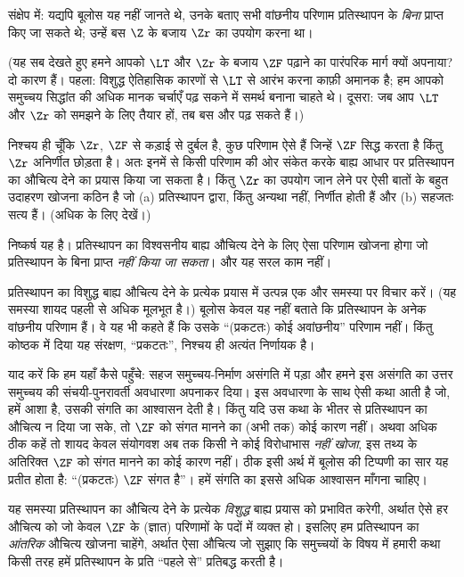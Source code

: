 \documentclass[../../../include/open-logic-section]{subfiles}
\begin{document}
संक्षेप में: यद्यपि बूलोस यह नहीं जानते थे, उनके बताए सभी वांछनीय परिणाम
प्रतिस्थापन के \emph{बिना} प्राप्त किए जा सकते थे; उन्हें बस $\Z$ के बजाय
$\Zr$ का उपयोग करना था।

(यह सब देखते हुए हमने आपको $\LT$ और $\Zr$ के बजाय $\ZF$ पढ़ाने का पारंपरिक
मार्ग क्यों अपनाया? दो कारण हैं। पहला: विशुद्ध ऐतिहासिक कारणों से $\LT$ से
आरंभ करना काफ़ी अमानक है; हम आपको समुच्चय सिद्धांत की अधिक मानक चर्चाएँ पढ़
सकने में समर्थ बनाना चाहते थे। दूसरा: जब आप $\LT$ और $\Zr$ को समझने के लिए
तैयार हों, तब बस \citealt{Potter2004} और \citealt{ButtonLT1} पढ़ सकते हैं।)

निश्चय ही चूँकि $\Zr$, $\ZF$ से कड़ाई से दुर्बल है, कुछ परिणाम ऐसे हैं
जिन्हें $\ZF$ सिद्ध करता है किंतु $\Zr$ अनिर्णीत छोड़ता है। अतः इनमें से
किसी परिणाम की ओर संकेत करके बाह्य आधार पर प्रतिस्थापन का औचित्य देने का
प्रयास किया जा सकता है। किंतु $\Zr$ का उपयोग जान लेने पर ऐसी बातों के बहुत
उदाहरण खोजना कठिन है जो (a) प्रतिस्थापन द्वारा, किंतु अन्यथा नहीं, निर्णीत
होती हैं और (b) सहजतः सत्य हैं। (अधिक के लिए
\citealt[\S13.2]{Potter2004} देखें।)

निष्कर्ष यह है। प्रतिस्थापन का विश्वसनीय बाह्य औचित्य देने के लिए ऐसा परिणाम
खोजना होगा जो प्रतिस्थापन के बिना प्राप्त \emph{नहीं किया जा सकता}। और यह
सरल काम नहीं।

प्रतिस्थापन का विशुद्ध बाह्य औचित्य देने के प्रत्येक प्रयास में उत्पन्न एक
और समस्या पर विचार करें। (यह समस्या शायद पहली से अधिक मूलभूत है।) बूलोस
केवल यह नहीं बताते कि प्रतिस्थापन के अनेक वांछनीय परिणाम हैं। वे यह भी कहते
हैं कि उसके ``(प्रकटतः) कोई अवांछनीय'' परिणाम नहीं। किंतु कोष्ठक में दिया यह
संरक्षण, ``प्रकटतः'', निश्चय ही अत्यंत निर्णायक है।

याद करें कि हम यहाँ कैसे पहुँचे: सहज समुच्चय-निर्माण असंगति में पड़ा और हमने
इस असंगति का उत्तर समुच्चय की संचयी-पुनरावर्ती अवधारणा अपनाकर दिया। इस
अवधारणा के साथ ऐसी कथा आती है जो, हमें आशा है, उसकी संगति का आश्वासन देती
है। किंतु यदि उस कथा के भीतर से प्रतिस्थापन का औचित्य न दिया जा सके, तो
$\ZF$ को संगत मानने का (अभी तक) कोई कारण नहीं। अथवा अधिक ठीक कहें तो शायद
केवल संयोगवश अब तक किसी ने कोई विरोधाभास \emph{नहीं खोजा}, इस तथ्य के
अतिरिक्त $\ZF$ को संगत मानने का कोई कारण नहीं। ठीक इसी अर्थ में बूलोस की
टिप्पणी का सार यह प्रतीत होता है: ``(प्रकटतः) $\ZF$ संगत है''। हमें संगति
का इससे अधिक आश्वासन माँगना चाहिए।

यह समस्या प्रतिस्थापन का औचित्य देने के प्रत्येक \emph{विशुद्ध} बाह्य
प्रयास को प्रभावित करेगी, अर्थात ऐसे हर औचित्य को जो केवल $\ZF$ के (ज्ञात)
परिणामों के पदों में व्यक्त हो। इसलिए हम प्रतिस्थापन का \emph{आंतरिक}
औचित्य खोजना चाहेंगे, अर्थात ऐसा औचित्य जो सुझाए कि समुच्चयों के विषय में
हमारी कथा किसी तरह हमें प्रतिस्थापन के प्रति ``पहले से'' प्रतिबद्ध करती है।
\end{document}
